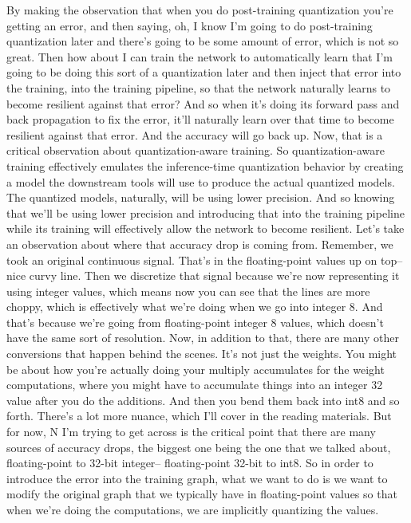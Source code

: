 By making the observation that when you do post-training quantization
you're getting an error, and then saying,
oh, I know I'm going to do post-training quantization later
and there's going to be some amount of error, which is not so great.
Then how about I can train the network to automatically learn
that I'm going to be doing this sort of a quantization later
and then inject that error into the training, into the training pipeline,
so that the network naturally learns to become resilient against that error?
And so when it's doing its forward pass and back propagation to fix the error,
it'll naturally learn over that time to become resilient against that error.
And the accuracy will go back up.
Now, that is a critical observation about quantization-aware training.
So quantization-aware training effectively
emulates the inference-time quantization behavior
by creating a model the downstream tools will use
to produce the actual quantized models.
The quantized models, naturally, will be using lower precision.
And so knowing that we'll be using lower precision
and introducing that into the training pipeline
while its training will effectively allow the network to become resilient.
Let's take an observation about where that accuracy drop is coming from.
Remember, we took an original continuous signal.
That's in the floating-point values up on top-- nice curvy line.
Then we discretize that signal because we're now
representing it using integer values, which
means now you can see that the lines are more choppy,
which is effectively what we're doing when we go into integer 8.
And that's because we're going from floating-point integer 8 values, which
doesn't have the same sort of resolution.
Now, in addition to that, there are many other conversions
that happen behind the scenes.
It's not just the weights.
You might be about how you're actually doing your multiply accumulates
for the weight computations, where you might
have to accumulate things into an integer 32 value
after you do the additions.
And then you bend them back into int8 and so forth.
There's a lot more nuance, which I'll cover in the reading materials.
But for now, N I'm trying to get across is the critical point that there are
many sources of accuracy drops, the biggest one being the one that we
talked about, floating-point to 32-bit integer--
floating-point 32-bit to int8.
So in order to introduce the error into the training graph, what we want to do
is we want to modify the original graph that we typically
have in floating-point values so that when we're doing the computations,
we are implicitly quantizing the values.
